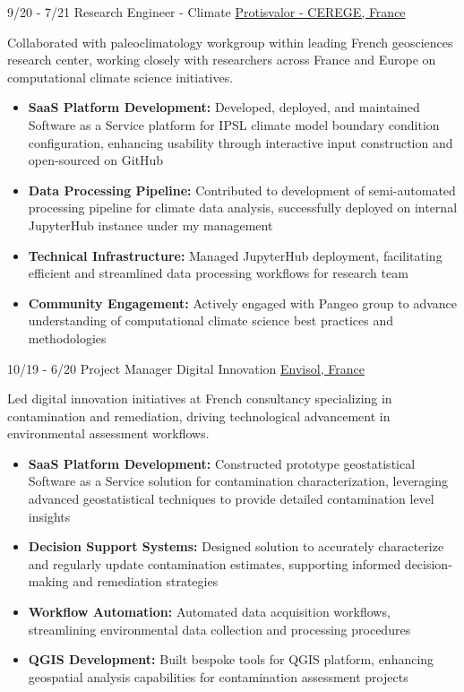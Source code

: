 \documentclass[]{friggeri-cv}
\begin{document}
  \vspace*{\fill}
\newpage
\vspace*{\fill}
\begin{entrylist}
	\entry
	{9/20 - 7/21}
	{Research Engineer - Climate}
	{\href{https://paleoclim-cnrs.github.io/}{Protisvalor - CEREGE, France}}
	{
	Collaborated with paleoclimatology workgroup within leading French geosciences research center, working closely with researchers across France and Europe on computational climate science initiatives.
	\\[-0.5em]
	\begin{itemize}[label={}, itemsep=3pt, leftmargin=0pt]
		\item \textbf{SaaS Platform Development:} Developed, deployed, and maintained Software as a Service platform for IPSL climate model boundary condition configuration, enhancing usability through interactive input construction and open-sourced on GitHub
		\item \textbf{Data Processing Pipeline:} Contributed to development of semi-automated processing pipeline for climate data analysis, successfully deployed on internal JupyterHub instance under my management
		\item \textbf{Technical Infrastructure:} Managed JupyterHub deployment, facilitating efficient and streamlined data processing workflows for research team
		\item \textbf{Community Engagement:} Actively engaged with Pangeo group to advance understanding of computational climate science best practices and methodologies
	\end{itemize}
	}
 	\entry
	{10/19 - 6/20}
	{Project Manager Digital Innovation}
	{\href{http://envisol.net/}{Envisol, France}}
	{
	Led digital innovation initiatives at French consultancy specializing in contamination and remediation, driving technological advancement in environmental assessment workflows.
	\\[-0.5em]
	\begin{itemize}[label={}, itemsep=3pt, leftmargin=0pt]
		\item \textbf{SaaS Platform Development:} Constructed prototype geostatistical Software as a Service solution for contamination characterization, leveraging advanced geostatistical techniques to provide detailed contamination level insights
		\item \textbf{Decision Support Systems:} Designed solution to accurately characterize and regularly update contamination estimates, supporting informed decision-making and remediation strategies
		\item \textbf{Workflow Automation:} Automated data acquisition workflows, streamlining environmental data collection and processing procedures
		\item \textbf{QGIS Development:} Built bespoke tools for QGIS platform, enhancing geospatial analysis capabilities for contamination assessment projects
	\end{itemize}
	}
  

\end{entrylist}
\end{document}
